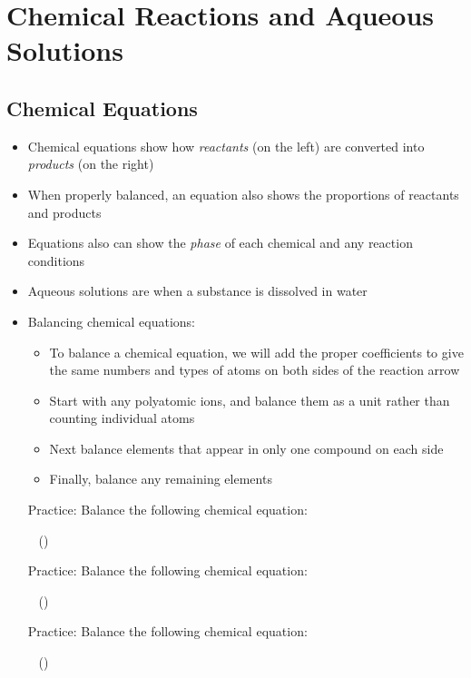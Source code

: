 \documentclass[12pt, openany, letterpaper]{memoir}
\begin{document}
\chapter{Chemical Reactions and Aqueous Solutions}
\section{Chemical Equations}
\begin{itemize}
	\item Chemical equations show how \emph{reactants} (on the left) are converted into \emph{products} (on the right)
	\item When properly balanced, an equation also shows the proportions of reactants and products
	\item Equations also can show the \emph{phase} of each chemical and any reaction conditions
	\item Aqueous solutions are when a substance is dissolved in water
	\item Balancing chemical equations:
	\begin{itemize}
		\item To balance a chemical equation, we will add the proper coefficients to give the same numbers and types of atoms on both sides of the reaction arrow
		\item Start with any polyatomic ions, and balance them as a unit rather than counting individual atoms
		\item Next balance elements that appear in only one compound on each side
		\item Finally, balance any remaining elements
	\end{itemize}

	Practice: Balance the following chemical equation: 
		
	~\hphantom{Practice:} ()
	
	Practice: Balance the following chemical equation: 
	
	~\hphantom{Practice:} ()
	
	Practice: Balance the following chemical equation: 
	
	~\hphantom{Practice:} ()
\end{itemize}
\end{document}
